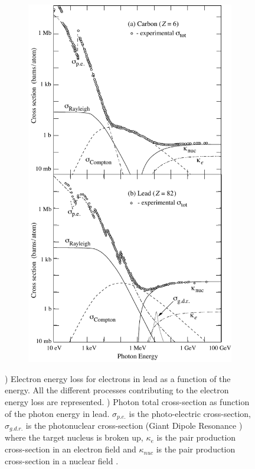 \begin{figure}[htbp!]
\begin{subfigure}[t]{0.43\textwidth}
    \includegraphics[width=1\linewidth]{chap2/fig/sigma_both_06.pdf}
    \caption{} \label{fig:GammaEMloss}
  \end{subfigure}
  \caption{) Electron energy loss for electrons in lead as a function of the energy. All the different processes contributing to the electron energy loss are represented. ) Photon total cross-section as function of the photon energy in lead. $\sigma_{p.e.}$ is the photo-electric cross-section, $\sigma_{g.d.r.}$ is the photonuclear cross-section (Giant Dipole Resonance \cite{Berman:1975tt}) where the target nucleus is broken up, $\kappa_{e}$ is the pair production cross-section in an electron field and $\kappa_{nuc}$ is the pair production cross-section in a nuclear field \cite{Patrignani:2016xqp}.}
\end{figure}

